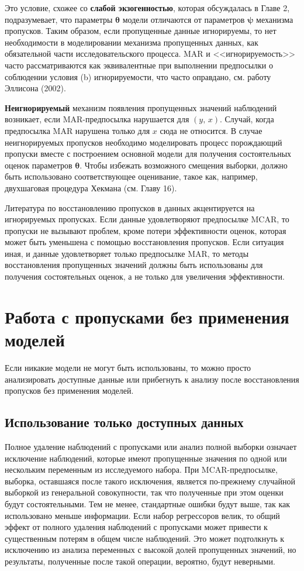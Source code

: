 Это условие, схожее со {\bf слабой экзогенностью}, которая обсуждалась в Главе 2, подразумевает, что параметры $\mathbf{\theta}$ модели отличаются от параметров $\mathbf{\psi}$ механизма пропусков. Таким образом, если пропущенные данные игнорируемы, то нет необходимости в моделировании механизма пропущенных данных, как обязательной части исследовательского процесса. MAR и <<игнорируемость>> часто рассматриваются как эквивалентные при выполнении предпосылки о соблюдении условия (b) игнорируемости, что часто оправдано, см. работу Эллисона (2002).

{\bf Неигнорируемый} механизм появления пропущенных значений наблюдений возникает, если MAR-предпосылка нарушается для $(y, \, x)$. Случай, когда предпосылка MAR нарушена только для $x$ сюда не относится. В случае неигнорируемых пропусков необходимо моделировать процесс порождающий пропуски вместе с построением основной модели для получения состоятельных оценок параметров $\mathbf{\theta}$. Чтобы избежать возможного смещения выборки, должно быть использовано соответствующее оценивание, такое как, например, двухшаговая процедура Хекмана (см. Главу 16).

Литература по восстановлению пропусков в данных акцентируется на игнорируемых пропусках. Если  данные удовлетворяют предпосылке MCAR, то пропуски не вызывают проблем, кроме потери эффективности оценок, которая может быть уменьшена с помощью восстановления пропусков. Если ситуация иная, и данные удовлетворяет только предпосылке MAR, то методы восстановления пропущенных значений  должны быть использованы для  получения состоятельных оценок, а не только для увеличения  эффективности.

\section{Работа с пропусками  без применения моделей} 

Если никакие модели не могут быть использованы, то можно просто анализировать доступные данные или прибегнуть к анализу после восстановления пропусков без применения моделей.

\subsection{Использование только доступных данных}
Полное удаление наблюдений с пропусками или анализ полной выборки  означает исключение наблюдений, которые имеют пропущенные значения по одной или нескольким переменным из исследуемого набора. При MCAR-предпосылке, выборка, оставшаяся после такого исключения, является по-прежнему случайной выборкой из генеральной совокупности, так что полученные при этом оценки будут состоятельными. Тем не менее, стандартные ошибки будут выше, так как использовано меньше информации. Если набор регрессоров велик, то общий эффект от полного удаления наблюдений с пропусками может привести к существенным потерям в общем числе наблюдений. Это может подтолкнуть к  исключению из анализа переменных с высокой долей пропущенных значений, но результаты, полученные после такой операции, вероятно, будут неверными. 


